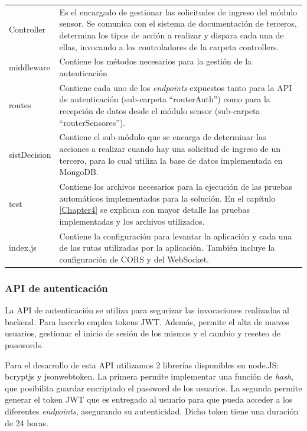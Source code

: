\begin{table}[h]
\begin{tabular}{p{2cm} p{11cm}}
Controller & Es el encargado de gestionar las solicitudes de ingreso del módulo sensor. Se comunica con el sistema de documentación de terceros, determina los tipos de acción a realizar y dispara cada una de ellas, invocando a los controladores de la carpeta controllers.  \\
middleware & Contiene los métodos necesarios para la gestión de la autenticación \\
routes & Contiene cada uno de los \textit{endpoints} expuestos tanto para la API de autenticación (sub-carpeta ``routerAuth'') como para la recepción de datos desde el módulo sensor (sub-carpeta ``routerSensores''). \\
sistDecision & Contiene el sub-módulo que se encarga de determinar las acciones a realizar cuando hay una solicitud de ingreso de un tercero, para lo cual utiliza la base de datos implementada en MongoDB. \\
test & Contiene los archivos necesarios para la ejecución de las pruebas automáticos implementados para la solución. En el capítulo \ref{Chapter4} se explican con mayor detalle las pruebas implementadas y los archivos utilizados. \\
index.js & Contiene la configuración para levantar la aplicación y cada una de las rutas utilizadas por la aplicación. También incluye la configuración de CORS y del WebSocket. \\
		\bottomrule
		\hline
	\end{tabular}
	\label{tab:carpetasBackend}
\end{table}

\clearpage
\subsubsection{API de autenticación}

La API de autenticación se utiliza para segurizar las invocaciones realizadas al backend. Para hacerlo emplea tokens JWT. Además, permite el alta de nuevos usuarios, gestionar el inicio de sesión de los mismos y el cambio y reseteo de passwords.

Para el desarrollo de esta API utilizamos 2 librerías disponibles en node.JS: bcryptjs y jsonwebtoken. La primera permite implementar una función de \textit{hash}, que posibilita guardar encriptado el password de los usuarios. La segunda permite generar el token JWT que es entregado al usuario para que pueda acceder a los diferentes \textit{endpoints}, asegurando su autenticidad. Dicho token tiene una duración de 24 horas.

